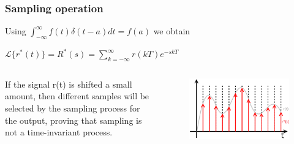 \begin{frame}
	\frametitle{Sampling operation}
	\begin{block}{}
	Using $\int_{-\infty}^{\infty} f(t)\delta(t-a)dt = f(a)$ we obtain \\ 
	\begin{center}
		$\mathcal{L}\{r^*(t)\} = R^*(s) = \sum_{k=-\infty}^{\infty} r(kT)e^{-skT}$
	\end{center}
	\end{block}
	\vspace{1em}
	\begin{columns}
		\begin{column}{0.5\textwidth}
			If the signal r(t) is shifted a small amount, then different samples will be selected by the sampling process for the output, proving that sampling is not a time-invariant process.
		\end{column}
		\begin{column}{0.5\textwidth}
			\begin{figure}
				\includegraphics[width=0.9\linewidth]{sampled_signal}
			\end{figure}	
		\end{column}	
	\end{columns}
\end{frame}

